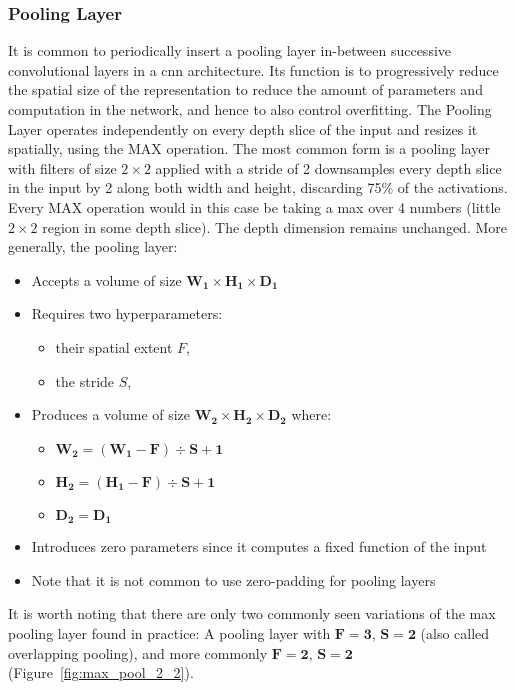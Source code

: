 \subsubsection{Pooling Layer}
It is common to periodically insert a pooling layer in-between successive
convolutional layers in a \acrshort{cnn} architecture. Its function is to
progressively reduce the spatial size of the representation to reduce the
amount of parameters and computation in the network, and hence to also control
overfitting. The Pooling Layer operates independently on every depth slice of
the input and resizes it spatially, using the MAX operation. The most common
form is a pooling layer with filters of size $2\times2$ applied with a stride
of 2 downsamples every depth slice in the input by 2 along both width and
height, discarding 75\% of the activations. Every MAX operation would in this
case be taking a max over 4 numbers (little $2\times2$ region in some depth
slice). The depth dimension remains unchanged. More generally, the pooling
layer:
\begin{itemize}
    \item Accepts a volume of size $\boldsymbol{W_1 \times H_1 \times D_1}$
    \item Requires two hyperparameters:
    \begin{itemize}
    \item their spatial extent $F$,
    \item the stride $S$,
    \end{itemize}
    \item Produces a volume of size
    $\boldsymbol{W_2 \times H_2 \times D_2}$ where:
    \begin{itemize}
    \item $\boldsymbol{W_2 = (W_1 - F) \div S + 1}$
    \item $\boldsymbol{H_2 = (H_1 - F) \div S + 1}$
    \item $\boldsymbol{D_2 = D_1}$
    \end{itemize}
    \item Introduces zero parameters since it computes a fixed function of the
    input
    \item Note that it is not common to use zero-padding for pooling layers
\end{itemize}
It is worth noting that there are only two commonly seen variations of the max
pooling layer found in practice: A pooling layer with $\boldsymbol{F=3}$,
$\boldsymbol{S=2}$ (also called overlapping pooling), and more commonly
$\boldsymbol{F=2}$, $\boldsymbol{S=2}$ (Figure~\ref{fig:max_pool_2_2}).
